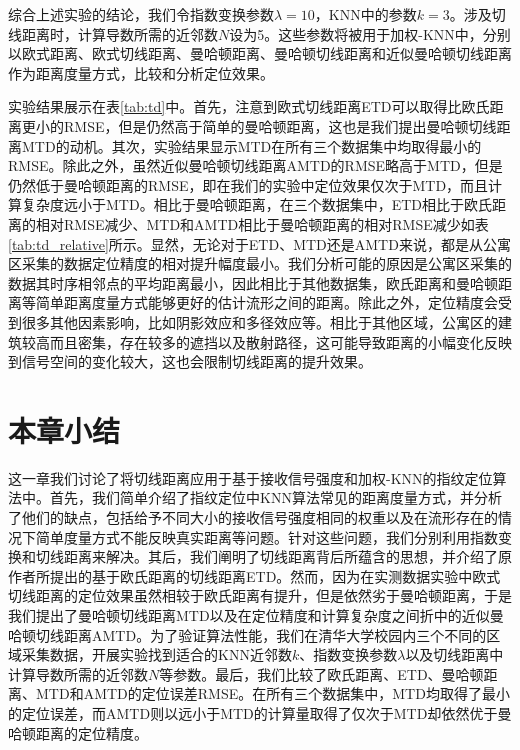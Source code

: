 综合上述实验的结论，我们令指数变换参数$\lambda=10$，KNN中的参数$k=3$。涉及切线距离时，计算导数所需的近邻数$N$设为5。这些参数将被用于加权-KNN中，分别以欧式距离、欧式切线距离、曼哈顿距离、曼哈顿切线距离和近似曼哈顿切线距离作为距离度量方式，比较和分析定位效果。

实验结果展示在表\ref{tab:td}中。首先，注意到欧式切线距离ETD可以取得比欧氏距离更小的RMSE，但是仍然高于简单的曼哈顿距离，这也是我们提出曼哈顿切线距离MTD的动机。其次，实验结果显示MTD在所有三个数据集中均取得最小的RMSE。除此之外，虽然近似曼哈顿切线距离AMTD的RMSE略高于MTD，但是仍然低于曼哈顿距离的RMSE，即在我们的实验中定位效果仅次于MTD，而且计算复杂度远小于MTD。相比于曼哈顿距离，在三个数据集中，ETD相比于欧氏距离的相对RMSE减少、MTD和AMTD相比于曼哈顿距离的相对RMSE减少如表\ref{tab:td_relative}所示。显然，无论对于ETD、MTD还是AMTD来说，都是从公寓区采集的数据定位精度的相对提升幅度最小。我们分析可能的原因是公寓区采集的数据其时序相邻点的平均距离最小，因此相比于其他数据集，欧氏距离和曼哈顿距离等简单距离度量方式能够更好的估计流形之间的距离。除此之外，定位精度会受到很多其他因素影响，比如阴影效应和多径效应等。相比于其他区域，公寓区的建筑较高而且密集，存在较多的遮挡以及散射路径，这可能导致距离的小幅变化反映到信号空间的变化较大，这也会限制切线距离的提升效果。

\section{本章小结}

这一章我们讨论了将切线距离应用于基于接收信号强度和加权-KNN的指纹定位算法中。首先，我们简单介绍了指纹定位中KNN算法常见的距离度量方式，并分析了他们的缺点，包括给予不同大小的接收信号强度相同的权重以及在流形存在的情况下简单度量方式不能反映真实距离等问题。针对这些问题，我们分别利用指数变换和切线距离来解决。其后，我们阐明了切线距离背后所蕴含的思想，并介绍了原作者所提出的基于欧氏距离的切线距离ETD。然而，因为在实测数据实验中欧式切线距离的定位效果虽然相较于欧氏距离有提升，但是依然劣于曼哈顿距离，于是我们提出了曼哈顿切线距离MTD以及在定位精度和计算复杂度之间折中的近似曼哈顿切线距离AMTD。为了验证算法性能，我们在清华大学校园内三个不同的区域采集数据，开展实验找到适合的KNN近邻数$k$、指数变换参数$\lambda$以及切线距离中计算导数所需的近邻数$N$等参数。最后，我们比较了欧氏距离、ETD、曼哈顿距离、MTD和AMTD的定位误差RMSE。在所有三个数据集中，MTD均取得了最小的定位误差，而AMTD则以远小于MTD的计算量取得了仅次于MTD却依然优于曼哈顿距离的定位精度。





